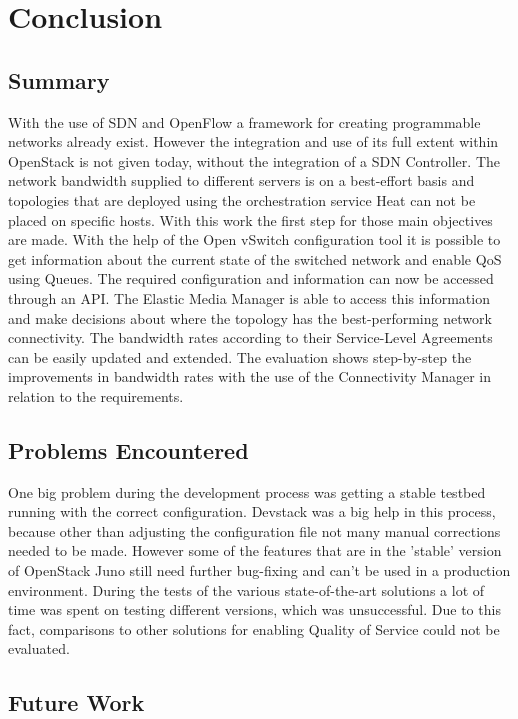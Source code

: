  \cleardoublepage
\chapter{Conclusion}

\section{Summary}

With the use of SDN and OpenFlow a framework for creating programmable networks already exist. However the integration and use of its full extent within OpenStack is not given today, without the integration of a SDN Controller. The network bandwidth supplied to different servers is on a best-effort basis and topologies that are deployed using the orchestration service Heat can not be placed on specific hosts. With this work the first step for those main objectives are made. With the help of the Open vSwitch configuration tool it is possible to get information about the current state of the switched network and enable QoS using Queues. The required configuration and information can now be accessed through an API. The Elastic Media Manager is able to access this information and make decisions about where the topology has the best-performing network connectivity. The bandwidth rates according to their Service-Level Agreements can be easily updated and extended. The evaluation shows step-by-step the improvements in bandwidth rates with the use of the Connectivity Manager in relation to the requirements.

\section{Problems Encountered}

One big problem during the development process was getting a stable testbed running with the correct configuration. Devstack was a big help in this process, because other than adjusting the configuration file not many manual corrections needed to be made. However some of the features that are in the 'stable' version of OpenStack Juno still need further bug-fixing and can't be used in a production environment. During the tests of the various state-of-the-art solutions a lot of time was spent on testing different versions, which was unsuccessful. Due to this fact, comparisons to other solutions for enabling Quality of Service could not be evaluated. 

\section{Future Work}

